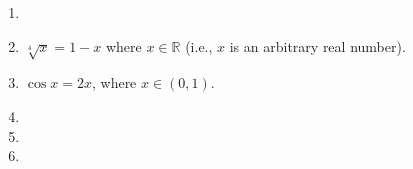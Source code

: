 

\begin{multicols}{2}
\begin{enumerate}[ref={\fcProblemRef}]
\item 

\item $\sqrt[4]{x}=1-x$ where $x\in \mathbb R$ (i.e., $x$ is an arbitrary real number).
\item $\cos x=2x$, where $x\in (0,1)$.
\item 

\item 

\item 


\end{enumerate}
\end{multicols}
